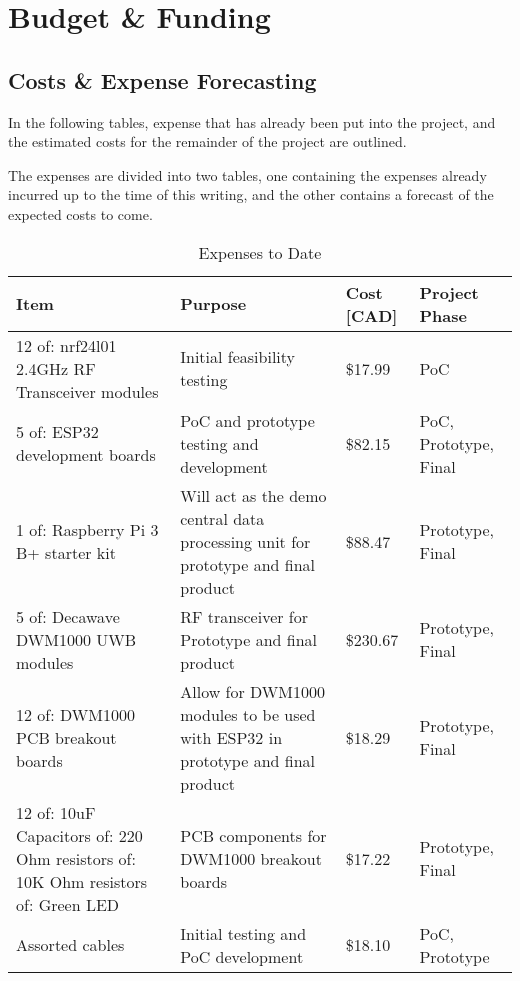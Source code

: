 

\setcounter{section}{3}
\section{Budget \& Funding}
\bigskip

\subsection{Costs \& Expense Forecasting}
In the following tables, expense that has already been put into the project, and the estimated costs for the remainder of the project are outlined. 

The expenses are divided into two tables, one containing the expenses already incurred up to the time of this writing, and the other contains a forecast of the expected costs to come.

\begin{table}[H]
\centering
\begin{tabular}{ | m{4.75cm} | m{5cm} | m{2.5cm} | m{3cm} |}
\hline
\textbf{Item} & \textbf{Purpose} & \textbf{Cost [CAD]} & \textbf{Project Phase}  \\
\hline
12 of: nrf24l01 2.4GHz RF Transceiver modules & Initial feasibility testing & \$17.99 & PoC \\
\hline
5 of: ESP32 development boards & PoC and prototype testing and development & \$82.15 & PoC, Prototype, Final \\
\hline
1 of: Raspberry Pi 3 B+ starter kit & Will act as the demo central data processing unit for prototype and final product & \$88.47 & Prototype, Final \\
\hline
5 of: Decawave DWM1000 UWB modules & RF transceiver for Prototype and final product & \$230.67 & Prototype, Final \\
\hline
12 of: DWM1000 PCB breakout boards & Allow for DWM1000 modules to be used with ESP32 in prototype and final product & \$18.29 & Prototype, Final \\
\hline
12 of: 10uF Capacitors \newline 
24 of: 220 Ohm resistors \newline 
12 of: 10K Ohm resistors \newline 
25 of: Green LED & PCB components for DWM1000 breakout boards & \$17.22 & Prototype, Final\\
\hline
Assorted cables & Initial testing and PoC development & \$18.10 & PoC, Prototype \\
\hline
\end{tabular}
\caption{Expenses to Date}
\end{table}

